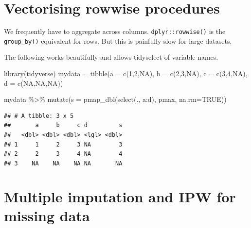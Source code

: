 \documentclass[
]{book}
\newenvironment{Shaded}{\begin{snugshade}}{\end{snugshade}}
\newcommand{\AttributeTok}[1]{\textcolor[rgb]{0.77,0.63,0.00}{#1}}
\newcommand{\ConstantTok}[1]{\textcolor[rgb]{0.00,0.00,0.00}{#1}}
\newcommand{\DecValTok}[1]{\textcolor[rgb]{0.00,0.00,0.81}{#1}}
\newcommand{\FunctionTok}[1]{\textcolor[rgb]{0.00,0.00,0.00}{#1}}
\newcommand{\NormalTok}[1]{#1}
\newcommand{\OtherTok}[1]{\textcolor[rgb]{0.56,0.35,0.01}{#1}}
\newcommand{\SpecialCharTok}[1]{\textcolor[rgb]{0.00,0.00,0.00}{#1}}
\begin{document}
\hypertarget{vectorising-rowwise-procedures}{%
\section{Vectorising rowwise procedures}\label{vectorising-rowwise-procedures}}

We frequently have to aggregate across columns. \texttt{dplyr::rowwise()} is the \texttt{group\_by()} equivalent for rows. But this is painfully slow for large datasets.

The following works beautifully and allows tidyselect of variable names.

\begin{Shaded}
\begin{Highlighting}[]
\FunctionTok{library}\NormalTok{(tidyverse)}
\NormalTok{mydata }\OtherTok{=} \FunctionTok{tibble}\NormalTok{(}\AttributeTok{a =} \FunctionTok{c}\NormalTok{(}\DecValTok{1}\NormalTok{,}\DecValTok{2}\NormalTok{,}\ConstantTok{NA}\NormalTok{),}
       \AttributeTok{b =} \FunctionTok{c}\NormalTok{(}\DecValTok{2}\NormalTok{,}\DecValTok{3}\NormalTok{,}\ConstantTok{NA}\NormalTok{),}
       \AttributeTok{c =} \FunctionTok{c}\NormalTok{(}\DecValTok{3}\NormalTok{,}\DecValTok{4}\NormalTok{,}\ConstantTok{NA}\NormalTok{),}
       \AttributeTok{d =} \FunctionTok{c}\NormalTok{(}\ConstantTok{NA}\NormalTok{,}\ConstantTok{NA}\NormalTok{,}\ConstantTok{NA}\NormalTok{))}

\NormalTok{mydata }\SpecialCharTok{\%\textgreater{}\%} 
  \FunctionTok{mutate}\NormalTok{(}\AttributeTok{s =} \FunctionTok{pmap\_dbl}\NormalTok{(}\FunctionTok{select}\NormalTok{(., a}\SpecialCharTok{:}\NormalTok{d), pmax, }\AttributeTok{na.rm=}\ConstantTok{TRUE}\NormalTok{))}
\end{Highlighting}
\end{Shaded}

\begin{verbatim}
## # A tibble: 3 x 5
##       a     b     c d         s
##   <dbl> <dbl> <dbl> <lgl> <dbl>
## 1     1     2     3 NA        3
## 2     2     3     4 NA        4
## 3    NA    NA    NA NA       NA
\end{verbatim}

\hypertarget{multiple-imputation-and-ipw-for-missing-data}{%
\section{Multiple imputation and IPW for missing data}\label{multiple-imputation-and-ipw-for-missing-data}}
\end{document}
